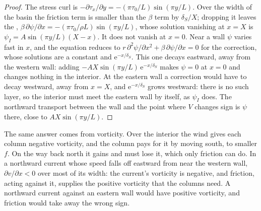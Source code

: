 \begin{proof}
The stress curl is $-\partial\tau_x/\partial y = -(\pi\tau_0/L)\sin(\pi
y/L)$. Over the width of the basin the friction term is smaller than the
$\beta$ term by $\delta_S/X$; dropping it leaves the ,
$\beta\,\partial\psi/\partial x = -(\pi\tau_0/\rho L)\sin(\pi y/L)$, whose
solution vanishing at $x = X$ is $\psi_I = A\sin(\pi y/L)(X - x)$. It does
not vanish at $x = 0$. Near a wall $\psi$ varies fast in $x$, and the
equation reduces to $r\,\partial^2\psi/\partial x^2 + \beta\,\partial\psi/
\partial x = 0$ for the correction, whose solutions are a constant and
$\mathrm e^{-x/\delta_S}$. This one decays eastward, away from the western
wall: adding $-AX\sin(\pi y/L)\,\mathrm e^{-x/\delta_S}$ makes $\psi = 0$
at $x = 0$ and changes nothing in the interior. At the eastern wall a
correction would have to decay westward, away from $x = X$, and
$\mathrm e^{-x/\delta_S}$ grows westward: there is no such layer, so the
interior must meet the eastern wall by itself, as $\psi_I$ does. The
northward transport between the wall and the point where $V$ changes sign
is $\psi$ there, close to $AX\sin(\pi y/L)$.
\end{proof}

The same answer comes from vorticity. Over the interior the wind gives
each column negative vorticity, and the column pays for it by moving
south, to smaller $f$. On the way back north it gains 
and must lose it, which only friction can do. In a northward current
whose speed falls off eastward from near the western wall, $\partial
v/\partial x < 0$ over most of its width: the current's vorticity is negative, and friction, acting against
it, supplies the positive vorticity that the columns need. A northward
current against an eastern wall would have positive vorticity, and
friction would take away the wrong sign.

